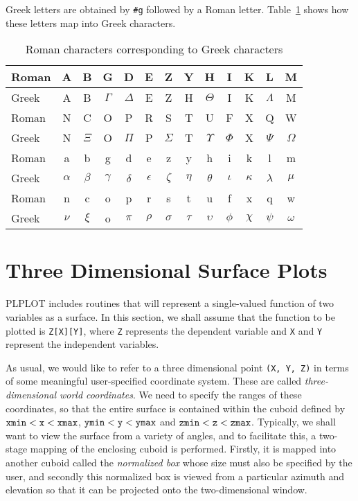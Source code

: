 Greek letters are obtained by \verb+#g+ followed by a Roman letter.
Table~\ref{greek} shows how these letters map into Greek characters.
\begin{table}
   \centering
   \begin{tabular}{|l|*{12}{c|}}
   \hline
   Roman&A&B&G&D&E&Z&Y&H&I&K&L&M\\
   \hline
   Greek&A & B & $\Gamma$ & $\Delta$ & E & Z & H & $\Theta$ & I & K &
   $\Lambda$ & M \\
   \hline\hline
   Roman&N&C&O&P&R&S&T&U&F&X&Q&W\\
   \hline
   Greek&N & $\Xi$ & O & $\Pi$ & P & $\Sigma$ &
   T & $\Upsilon$ & $\Phi$ & X & $\Psi$ & $\Omega$ \\
   \hline\hline
   Roman&a&b&g&d&e&z&y&h&i&k&l&m\\
   \hline
   Greek&   $\alpha$ & $\beta$ & $\gamma$ & $\delta$ & $\epsilon$ & $\zeta$ &
   $\eta$ & $\theta$ & $\iota$ & $\kappa$ &
   $\lambda$ & $\mu$ \\
   \hline\hline
   Roman&n&c&o&p&r&s&t&u&f&x&q&w\\
   \hline
   Greek& $\nu$ & $\xi$ & o & $\pi$ & $\rho$ & $\sigma$ &
   $\tau$ & $\upsilon$ & $\phi$ & $\chi$ & $\psi$ & $\omega$ \\
   \hline
   \end{tabular}
\caption{Roman characters corresponding to Greek characters}
\label{greek}
\end{table}


\section {Three Dimensional Surface Plots} \label{threed}

PLPLOT includes routines that will represent a single-valued function
of two variables as a surface. In this section, we shall assume that
the function to be plotted is {\tt Z[X][Y]}, where {\tt Z} represents
the dependent variable and {\tt X} and {\tt Y} represent the independent
variables.

As usual, we would like to refer to a three dimensional point {\tt (X, Y, Z)}
in terms of some meaningful user-specified coordinate system. These are
called {\em three-dimensional world coordinates}. We need to specify the
ranges of these coordinates, so that the entire surface is contained within the
cuboid defined by ${\tt xmin}<{\tt x}<{\tt xmax}$, 
${\tt ymin}<{\tt y}<{\tt ymax}$ and
${\tt zmin}<{\tt z}<{\tt zmax}$. Typically, we shall want to view the
surface from a variety of angles, and to facilitate this, a two-stage
mapping of the enclosing cuboid is performed. Firstly, it is mapped
into another cuboid called the {\em normalized box\/} whose size must also
be specified by the user, and secondly this normalized box is viewed from
a particular azimuth and elevation so that it can be projected onto the
two-dimensional window.

